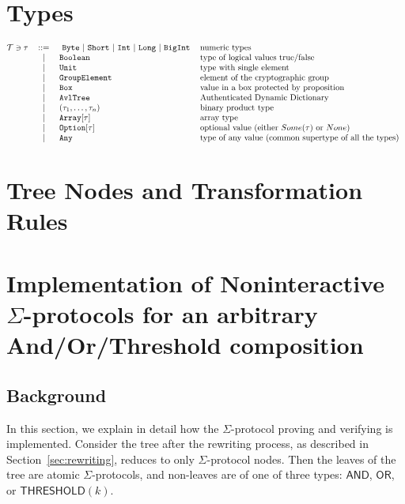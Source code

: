 \documentclass[11pt]{article}
\newcommand{\authnote}[2]{\marginpar{\parbox{\marginparwidth}{\tiny %
  \textsf{#1 {\textcolor{blue}{notes: #2}}}}}%
  \textcolor{blue}{\textbf{\dag}}}
\newcommand{\authnote}[2]{
  \textsf{#1 \textcolor{blue}{: #2}}}
\newcommand{\authnote}[2]{}
\newcommand{\lnote}[1]{{\authnote{\textcolor{orange}{Leo notes}}{#1}}}
\newcommand{\lst}[1]{\text{\lstinline[basicstyle={\ttfamily}]$#1$}}
\newcommand{\andnode}{\ensuremath{\mathsf{AND}}}
\newcommand{\ornode}{\ensuremath{\mathsf{OR}}}
\newcommand{\tnode}{\ensuremath{\mathsf{THRESHOLD}}}
\begin{document}
\section{Types}

\[\begin{tabular}{@{}l c l l}
      $\mathcal{T} \ni \tau$			& ::= 	    &\
         \lst{Byte} $\mid$ \lst{Short} $\mid$
         \lst{Int} $\mid$ \lst{Long} $\mid$ \lst{BigInt}  & numeric types     \\
      &	$\mid$	& \lst{Boolean} 			& type of logical values true/false   \\
      &	$\mid$	& \lst{Unit} 				& type with single element   \\
      &	$\mid$	& \lst{GroupElement} 		& element of the cryptographic group  \\
      &	$\mid$	& \lst{Box} 				& value in a box protected by proposition  \\
      &	$\mid$	& \lst{AvlTree} 			&  Authenticated Dynamic Dictionary \\
      &	$\mid$	& $(\tau_1, \dots, \tau_n) $	& binary product type  \\
      & $\mid$  & $\text{\lst{Array}}[\tau]$	& array type       \\
      & $\mid$  & $\text{\lst{Option}}[\tau]$	& optional value (either $Some(\tau)$ or $None$)      \\
      & $\mid$  & \lst{Any}                     & type of any value (common supertype of all the types) \\
\end{tabular}\]

\section{Tree Nodes and Transformation Rules}

\section{Implementation of Noninteractive $\Sigma$-protocols for an arbitrary And/Or/Threshold composition}
\subsection{Background}

\lnote{need to give some references that explain $\Sigma$-protocols well. Not sure what --- may need to dig through the literature}

In this section, we explain in detail how the $\Sigma$-protocol proving and verifying is implemented. Consider the tree after the rewriting process, as described in Section~\ref{sec:rewriting}, reduces to only $\Sigma$-protocol nodes. Then the leaves of the tree are atomic $\Sigma$-protocols, and non-leaves are of one of three types: $\andnode$, $\ornode$, or $\tnode(k)$. \lnote{connect these types to what's described above}
\end{document}
